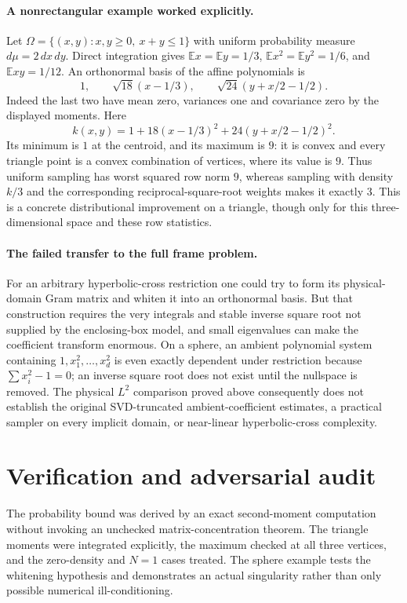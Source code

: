 \documentclass[11pt]{article}
\begin{document}
\paragraph{A nonrectangular example worked explicitly.}
Let $\Omega=\{(x,y):x,y\ge0,\ x+y\le1\}$ with uniform probability measure $d\mu=2\,dx\,dy$. Direct integration gives $\mathbb Ex=\mathbb Ey=1/3$, $\mathbb Ex^2=\mathbb Ey^2=1/6$, and $\mathbb Exy=1/12$. An orthonormal basis of the affine polynomials is
\[
 1,\qquad \sqrt{18}(x-1/3),\qquad
 \sqrt{24}(y+x/2-1/2).
\]
Indeed the last two have mean zero, variances one and covariance zero by the displayed moments. Here
\[
 k(x,y)=1+18(x-1/3)^2+24(y+x/2-1/2)^2.
\]
Its minimum is $1$ at the centroid, and its maximum is $9$: it is convex and every triangle point is a convex combination of vertices, where its value is $9$. Thus uniform sampling has worst squared row norm $9$, whereas sampling with density $k/3$ and the corresponding reciprocal-square-root weights makes it exactly $3$. This is a concrete distributional improvement on a triangle, though only for this three-dimensional space and these row statistics.

\paragraph{The failed transfer to the full frame problem.}
For an arbitrary hyperbolic-cross restriction one could try to form its physical-domain Gram matrix and whiten it into an orthonormal basis. But that construction requires the very integrals and stable inverse square root not supplied by the enclosing-box model, and small eigenvalues can make the coefficient transform enormous. On a sphere, an ambient polynomial system containing $1,x_1^2,\ldots,x_d^2$ is even exactly dependent under restriction because $\sum x_i^2-1=0$; an inverse square root does not exist until the nullspace is removed. The physical $L^2$ comparison proved above consequently does not establish the original SVD-truncated ambient-coefficient estimates, a practical sampler on every implicit domain, or near-linear hyperbolic-cross complexity.
\section{Verification and adversarial audit}
The probability bound was derived by an exact second-moment computation without invoking an unchecked matrix-concentration theorem. The triangle moments were integrated explicitly, the maximum checked at all three vertices, and the zero-density and $N=1$ cases treated. The sphere example tests the whitening hypothesis and demonstrates an actual singularity rather than only possible numerical ill-conditioning.
\end{document}
